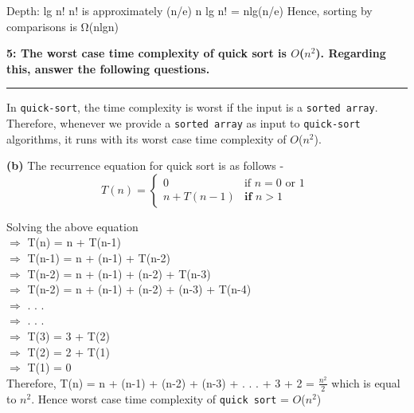 \documentclass[11pt]{article}
\newcommand\question[3]{\vspace{.25in}\textbf{#1: #2}\vspace{.5em}\hrule\vspace{.10in}}
\renewcommand\part[1]{\vspace{.10in}\textbf{(#1)}}
\begin{document}
Depth: lg n!
n! is approximately (n/e) n
lg n! = nlg(n/e)
Hence, sorting by comparisons is Ω(nlgn)

\question{5} {The worst case time complexity of quick sort is $O$($n^2$). Regarding this, answer the following questions.}

\part{a} In \texttt{quick-sort}, the time complexity is worst if the input is a \texttt{sorted array}. Therefore, whenever we provide a \texttt{sorted array} as input to \texttt{quick-sort} algorithms,  it runs with its worst case  time complexity of $O$($n^2$).

\part{b} The recurrence equation for quick sort is as follows -
		\[ T(n) = \begin{cases}
				0 & \text{if $n = 0$ or 1 } \\
				n + T(n-1) & \textbf{if $n > 1$}
			\end{cases}
		\]

Solving the above equation  \\
\hspace{4.5cm}$\Rightarrow$ T(n) =  n + T(n-1) \\
\hspace{4.5cm}$\Rightarrow$ T(n-1) =  n + (n-1) + T(n-2) \\
\hspace{4.5cm}$\Rightarrow$ T(n-2) =  n + (n-1) + (n-2) + T(n-3) \\
\hspace{4.5cm}$\Rightarrow$ T(n-2) =  n + (n-1) + (n-2) + (n-3) + T(n-4) \\
\hspace{4.5cm}$\Rightarrow$ . . . \\
\hspace{4.5cm}$\Rightarrow$ . . . \\
\hspace{4.5cm}$\Rightarrow$ T(3) =  3 + T(2) \\
\hspace{4.5cm}$\Rightarrow$ T(2) =  2 + T(1) \\
\hspace{4.5cm}$\Rightarrow$ T(1) =  0 \\
Therefore, T(n) = n + (n-1) + (n-2) + (n-3) + . . . + 3 + 2 = $\frac{n^2}{2}$ which is equal to $n^2$. Hence worst case time complexity of \texttt{quick sort} = $O$($n^2$)
 
\end{document}
